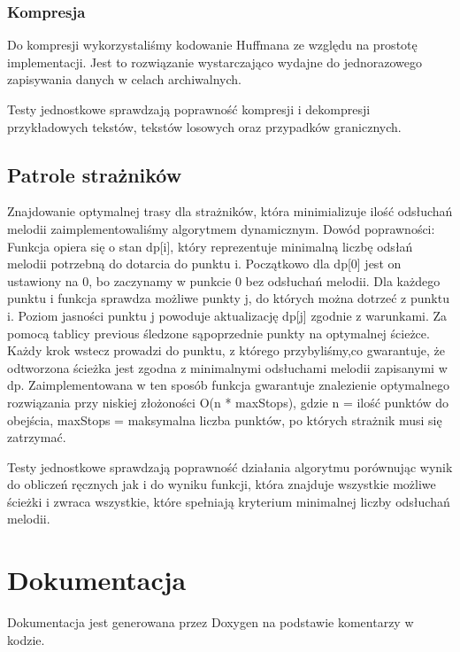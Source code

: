 \documentclass{article}
\begin{document}
\subsubsection{Kompresja}
Do kompresji wykorzystaliśmy kodowanie Huffmana ze względu na prostotę implementacji.
Jest to rozwiązanie wystarczająco wydajne
do jednorazowego zapisywania danych w celach archiwalnych.

\noindent Testy jednostkowe sprawdzają poprawność kompresji i dekompresji
przykładowych tekstów, tekstów losowych oraz przypadków granicznych.

\subsection{Patrole strażników}
Znajdowanie optymalnej trasy dla strażników, która minimializuje ilość odsłuchań melodii
zaimplementowaliśmy algorytmem dynamicznym.
Dowód poprawności:
Funkcja opiera się o stan dp[i], który reprezentuje minimalną liczbę odsłań
melodii potrzebną do dotarcia do punktu i. Początkowo dla dp[0] jest on ustawiony na 0,
bo zaczynamy w punkcie 0 bez odsłuchań melodii.
Dla każdego punktu i funkcja sprawdza możliwe punkty j, do których można dotrzeć z punktu i.
Poziom jasności punktu j powoduje aktualizację dp[j] zgodnie z warunkami. Za pomocą tablicy previous
śledzone sąpoprzednie punkty na optymalnej ścieżce. Każdy krok wstecz prowadzi do punktu, z którego
przybyliśmy,co gwarantuje, że odtworzona ścieżka jest zgodna z minimalnymi odsłuchami melodii
zapisanymi w dp. Zaimplementowana w ten sposób funkcja gwarantuje znalezienie optymalnego rozwiązania
przy niskiej złożoności O(n * maxStops), gdzie n = ilość punktów do obejścia, maxStops =
maksymalna liczba punktów, po których strażnik musi się zatrzymać.

\noindent Testy jednostkowe sprawdzają poprawność działania algorytmu porównując wynik
do obliczeń ręcznych jak i do wyniku funkcji, która znajduje wszystkie możliwe ścieżki i
zwraca wszystkie, które spełniają kryterium minimalnej liczby odsłuchań melodii.
\section{Dokumentacja}
Dokumentacja jest generowana przez Doxygen na podstawie komentarzy w kodzie.

\printbibliography[heading=bibnumbered]
\end{document}
